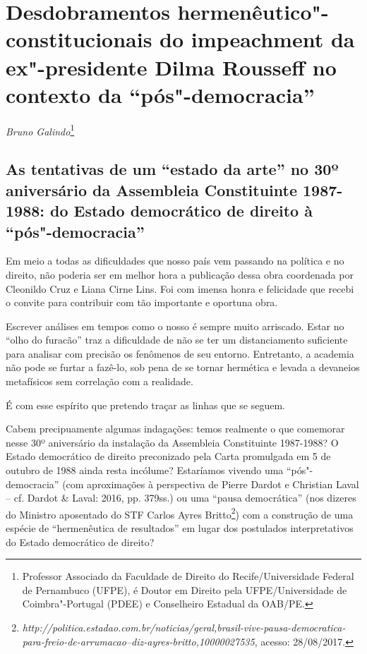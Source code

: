 \chapter{Desdobramentos hermenêutico"-constitucionais do
impeachment da ex"-presidente Dilma Rousseff no contexto da
``pós"-democracia''}

\begin{flushright}
\emph{Bruno Galindo}\footnote{Professor Associado da Faculdade de Direito do Recife/Universidade
Federal de Pernambuco (UFPE), é
Doutor em Direito pela UFPE/Universidade de Coimbra"-Portugal
(PDEE) e Conselheiro Estadual da OAB/PE.}
\end{flushright}


 \section{As tentativas de um ``estado da arte'' no 30º aniversário da
  Assembleia Constituinte 1987-1988: do Estado democrático de direito à
  ``pós"-democracia''}


Em meio a todas as dificuldades que nosso país vem passando na política
e no direito, não poderia ser em melhor hora a publicação dessa obra
coordenada por Cleonildo Cruz e Liana Cirne Lins. Foi com imensa honra e
felicidade que recebi o convite para contribuir com tão importante e
oportuna obra.

Escrever análises em tempos como o nosso é sempre muito arriscado. Estar
no ``olho do furacão'' traz a dificuldade de não se ter um
distanciamento suficiente para analisar com precisão os fenômenos de seu
entorno. Entretanto, a academia não pode se furtar a fazê-lo, sob pena
de se tornar hermética e levada a devaneios metafísicos sem correlação
com a realidade.

É com esse espírito que pretendo traçar as linhas que se seguem.

Cabem precipuamente algumas indagações: temos realmente o que comemorar
nesse 30º aniversário da instalação da Assembleia Constituinte
1987-1988? O Estado democrático de direito preconizado pela Carta
promulgada em 5 de outubro de 1988 ainda resta incólume? Estaríamos
vivendo uma ``pós"-democracia'' (com aproximações à perspectiva de Pierre
Dardot e Christian Laval -- cf. Dardot \& Laval: 2016, pp. 379ss.) ou
uma ``pausa democrática'' (nos dizeres do Ministro aposentado do STF
Carlos Ayres Britto\footnote{\emph{http://politica.estadao.com.br/noticias/geral,brasil-vive-pausa-democratica-para-freio-de-arrumacao--diz-ayres-britto,10000027535},
  acesso: 28/08/2017.}) com a construção de uma espécie de
``hermenêutica de resultados'' em lugar dos postulados interpretativos
do Estado democrático de direito?

